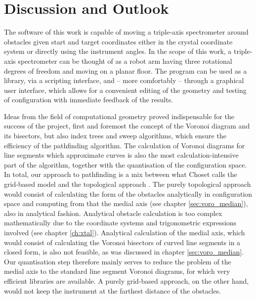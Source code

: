 %
%

\chapter{Discussion and Outlook}
\label{ch:outlook}
The software of this work is capable of moving a triple-axis spectrometer around obstacles 
given start and target coordinates either in the crystal coordinate system or directly using the instrument angles.
In the scope of this work, a triple-axis spectrometer can be thought of as a robot arm having three rotational
degrees of freedom and moving on a planar floor.
The program can be used as a library, via a scripting interface, and -- more comfortably -- through a graphical
user interface, which allows for a convenient editing of the geometry and testing of configuration
with immediate feedback of the results.

Ideas from the field of computational geometry proved indispensable for the success of the project,
first and foremost the concept of the Voronoi diagram and its bisectors, but also index trees and sweep 
algorithms, which ensure the efficiency of the pathfinding algorithm.
The calculation of Voronoi diagrams for line segments which approximate curves is also the most
calculation-intensive part of the algorithm, together with the quantisation of the configuration space.
In total, our approach to pathfinding is a mix between what Choset calls the grid-based model and the
topological approach \cite{Choset2010_ch8}.
The purely topological approach would consist of calculating the form of the obstacles analytically in
configuration space and computing from that the medial axis (see chapter \ref{sec:voro_median}), also
in analytical fashion. 
Analytical obstacle calculation is too complex mathematically due to the coordinate systems and trigonometric
expressions involved (see chapter \ref{ch:xtal}). Analytical calculation of the medial axis, which would consist
of calculating the Voronoi bisectors of curved line segments in a closed form, is also not feasible, 
as was discussed in chapter \ref{sec:voro_median}.
Our quantisation step therefore mainly serves to reduce the problem of the medial axis to the standard
line segment Voronoi diagrams, for which very efficient libraries are available. 
A purely grid-based approach, on the other hand, would not keep the instrument at the farthest distance
of the obstacles.

